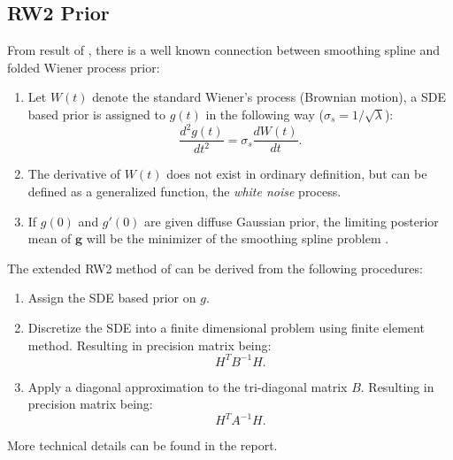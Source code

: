\documentclass{beamer} %
\begin{document}
\subsection{RW2 Prior}

\begin{frame}

From result of \cite{wahba}, there is a well known connection between smoothing spline and folded Wiener process prior:

\begin{enumerate}
\pause

\item Let $W(t)$ denote the standard Wiener's process (Brownian motion), a SDE based prior is assigned to $g(t)$ in the following way ($\sigma_s = 1/\sqrt{\lambda}$):
$$\frac{d^2g(t)}{dt^2} = \sigma_s\frac{dW(t)}{dt}.$$ 
\pause


\item The derivative of $W(t)$ does not exist in ordinary definition, but can be defined as a generalized function, the \textit{white noise} process. 

\pause


\item If $g(0)$ and $g'(0)$ are given diffuse Gaussian prior, the limiting posterior mean of $\boldsymbol g$ will be the minimizer of the smoothing spline problem \citep{wahba}.

\end{enumerate}
\end{frame}


\begin{frame}
The extended RW2 method of \cite{rw2} can be derived from the following procedures:
\begin{enumerate}
\pause
\item Assign the SDE based prior on $g$.
\pause
\item Discretize the SDE into a finite dimensional problem using finite element method. Resulting in precision matrix being: $$H^T B^{-1} H.$$
\pause
\item Apply a diagonal approximation to the tri-diagonal matrix $B$. Resulting in precision matrix being: $$H^T A^{-1} H.$$
\end{enumerate}


\pause

More technical details can be found in the report.

\end{frame}
\end{document}
